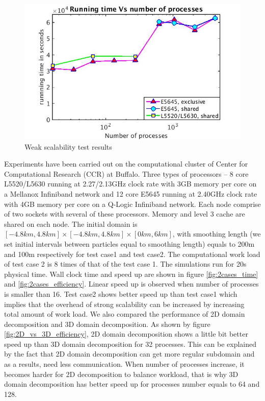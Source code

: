 \documentclass[conference,compsoc]{IEEEtran}
\begin{document}
%
\begin{figure}[!t]
\centering
\includegraphics[scale=0.35]{weak_loglog}
\caption{Weak scalability test results}
\label{fig:weak_loglog}
\end{figure}
Experiments have been carried out on the computational cluster of Center for Computational Research (CCR) at Buffalo. 
Three types of processors -- 8 core L5520/L5630 running at 2.27/2.13GHz clock rate with 3GB memory per core on a Mellanox Infiniband network and 12 core E5645 running at 2.40GHz clock rate with 4GB memory per core on a Q-Logic Infiniband network. Each node comprise of two sockets with several of these processors. Memory and level 3 cache are shared on each node. 
The initial domain is $[-4.8km,4.8km]\times [-4.8km,4.8km] \times [0km, 6km]$, with smoothing length (we set initial intervals between particles equal to smoothing length) equals to 200m and 100m respectively for test case1 and test case2. The computational work load of test case 2 is 8 times of that of the test case 1. The simulations run for 20s physical time.  Wall clock time and speed up are shown in figure \ref{fig:2cases_time} and \ref{fig:2cases_efficiency}. Linear speed up is observed when number of processes is smaller than 16. Test case2 shows better speed up than test case1 which implies that the overhead of strong scalability can be increased by increasing total amount of work load. We also compared the performance of 2D domain decomposition and 3D domain decomposition. As shown by figure \ref{fig:2D_vs_3D_efficiency}, 2D domain decomposition shows a little bit better speed up than 3D domain decomposition for 32 processes. This can be explained by the fact that 2D domain decomposition can get more regular subdomain and as a results, need less communication. When number of processes increase, it becomes harder for 2D decomposition to balance workload, that is why 3D domain decomposition has better speed up for processes number equals to 64 and 128.\\ 
\end{document}
